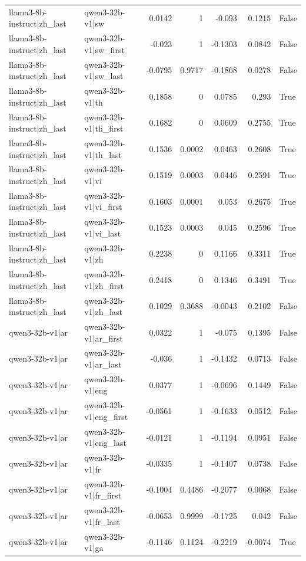 \begin{table}
\begin{tabular}{l l r r r r l}
llama3-8b-instruct|zh_last & qwen3-32b-v1|sw & 0.0142 & 1 & -0.093 & 0.1215 & False \\
llama3-8b-instruct|zh_last & qwen3-32b-v1|sw_first & -0.023 & 1 & -0.1303 & 0.0842 & False \\
llama3-8b-instruct|zh_last & qwen3-32b-v1|sw_last & -0.0795 & 0.9717 & -0.1868 & 0.0278 & False \\
llama3-8b-instruct|zh_last & qwen3-32b-v1|th & 0.1858 & 0 & 0.0785 & 0.293 & True \\
llama3-8b-instruct|zh_last & qwen3-32b-v1|th_first & 0.1682 & 0 & 0.0609 & 0.2755 & True \\
llama3-8b-instruct|zh_last & qwen3-32b-v1|th_last & 0.1536 & 0.0002 & 0.0463 & 0.2608 & True \\
llama3-8b-instruct|zh_last & qwen3-32b-v1|vi & 0.1519 & 0.0003 & 0.0446 & 0.2591 & True \\
llama3-8b-instruct|zh_last & qwen3-32b-v1|vi_first & 0.1603 & 0.0001 & 0.053 & 0.2675 & True \\
llama3-8b-instruct|zh_last & qwen3-32b-v1|vi_last & 0.1523 & 0.0003 & 0.045 & 0.2596 & True \\
llama3-8b-instruct|zh_last & qwen3-32b-v1|zh & 0.2238 & 0 & 0.1166 & 0.3311 & True \\
llama3-8b-instruct|zh_last & qwen3-32b-v1|zh_first & 0.2418 & 0 & 0.1346 & 0.3491 & True \\
llama3-8b-instruct|zh_last & qwen3-32b-v1|zh_last & 0.1029 & 0.3688 & -0.0043 & 0.2102 & False \\
qwen3-32b-v1|ar & qwen3-32b-v1|ar_first & 0.0322 & 1 & -0.075 & 0.1395 & False \\
qwen3-32b-v1|ar & qwen3-32b-v1|ar_last & -0.036 & 1 & -0.1432 & 0.0713 & False \\
qwen3-32b-v1|ar & qwen3-32b-v1|eng & 0.0377 & 1 & -0.0696 & 0.1449 & False \\
qwen3-32b-v1|ar & qwen3-32b-v1|eng_first & -0.0561 & 1 & -0.1633 & 0.0512 & False \\
qwen3-32b-v1|ar & qwen3-32b-v1|eng_last & -0.0121 & 1 & -0.1194 & 0.0951 & False \\
qwen3-32b-v1|ar & qwen3-32b-v1|fr & -0.0335 & 1 & -0.1407 & 0.0738 & False \\
qwen3-32b-v1|ar & qwen3-32b-v1|fr_first & -0.1004 & 0.4486 & -0.2077 & 0.0068 & False \\
qwen3-32b-v1|ar & qwen3-32b-v1|fr_last & -0.0653 & 0.9999 & -0.1725 & 0.042 & False \\
qwen3-32b-v1|ar & qwen3-32b-v1|ga & -0.1146 & 0.1124 & -0.2219 & -0.0074 & True \\

\end{tabular}
\end{table}
